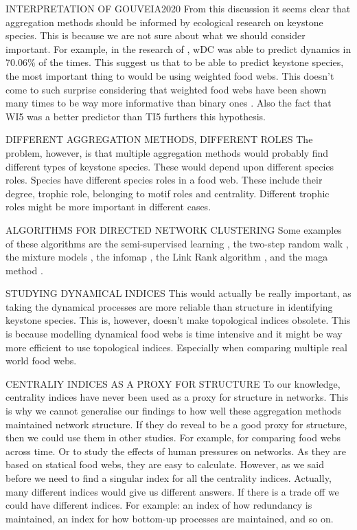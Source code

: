 INTERPRETATION OF GOUVEIA2020
From this discussion it seems clear that aggregation methods should be informed by ecological research on keystone species. This is because we are not sure about what we should consider important. For example, in the research of \citet{Gouveia2020}, wDC was able to predict dynamics in 70.06\% of the times. This suggest us that to be able to predict keystone species, the most important thing to would be using weighted food webs. This doesn't come to such surprise considering that weighted food webs have been shown many times to be way more informative than binary ones \citep{?}. Also the fact that WI5 was a better predictor than TI5 furthers this hypothesis.

DIFFERENT AGGREGATION METHODS, DIFFERENT ROLES
The problem, however, is that multiple aggregation methods would probably find different types of keystone species. These would depend upon different species roles.
Species have different species roles in a food web. These include their degree, trophic role, belonging to motif roles and centrality. Different trophic roles might be more important in different cases.

ALGORITHMS FOR DIRECTED NETWORK CLUSTERING
Some examples of these algorithms are the semi-supervised learning \citep{Zhou2005}, the two-step random walk \citep{Huang2006}, the mixture models \citep{Newman2007,Ramasco2008,Wang2008}, the infomap \citep{Rosvall2008}, the Link Rank algorithm \citep{Kim2010}, and the maga method \citep{Zhan2011}.

STUDYING DYNAMICAL INDICES
This would actually be really important, as taking the dynamical processes are more reliable than structure in identifying keystone species. This is, however, doesn't make topological indices obsolete. This is because modelling dynamical food webs is time intensive and it might be way more efficient to use topological indices. Especially when comparing multiple real world food webs.

CENTRALIY INDICES AS A PROXY FOR STRUCTURE
To our knowledge, centrality indices have never been used as a proxy for structure in networks. This is why we cannot generalise our findings to how well these aggregation methods maintained network structure. If they do reveal to be a good proxy for structure, then we could use them in other studies.
For example, for comparing food webs across time. Or to study the effects of human pressures on networks. As they are based on statical food webs, they are easy to calculate. However, as we said before we need to find a singular index for all the centrality indices. Actually, many different indices would give us different answers. If there is a trade off we could have different indices. For example: an index of how redundancy is maintained, an index for how bottom-up processes are maintained, and so on.

